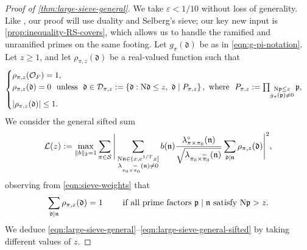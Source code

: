 \documentclass[11pt]{amsart}
\theoremstyle{remark}
\numberwithin{equation}{section}
\renewcommand{\d}{\mathfrak{d}}
\newcommand{\kd}{\mathfrak{d}}
\newcommand{\p}{\mathfrak{p}}
\newcommand{\n}{\mathfrak{n}}
\newcommand{\N}{\textnormal{N}}
\newcommand{\mD}{\mathcal{D}}
\newcommand{\mL}{\mathcal{L}}
\newcommand{\mO}{\mathcal{O}}
\newcommand{\mS}{\mathcal{S}}
\newcommand{\eps}{\varepsilon}
\renewcommand{\tilde}{\widetilde}
\begin{document}
\begin{proof}[Proof of \cref{thm:large-sieve-general}]
We take $\eps < 1/10$ without loss of generality. Like \cite[Theorem 4.2]{TZ_GLn}, our proof will use duality and Selberg's sieve; our key new input is \cref{prop:inequality-RS-covers}, which allows us to handle the ramified and unramified primes on the same footing.  Let $g_{\pi}(\kd)$ be as in \eqref{eqn:g-pi-notation}.  Let $z\geq 1$, and let $\rho_{\pi,z}(\kd)$ be a real-valued function such that
\begin{equation} \label{eqn:sieve-weights}
    \begin{cases} 
    \rho_{\pi,z}(\mO_F) = 1, \\ 
    \rho_{\pi,z}(\d) = 0\
    \text{ unless }\ 
    \kd \in \mD_{\pi,z} := \left\{\d : \N \d \le z,\ \d \mid P_{\pi,z}\right\},\text{ where }\ 
    P_{\pi,z} := \prod_{\substack{\N \p \le z \\ g_\pi(\p) \neq 0}} \p,\\
    |\rho_{\pi,z}(\kd)|\leq 1.
    \end{cases}
\end{equation}
We consider the general sifted sum
\begin{equation}\label{eqn:general-large-sieve-sum}
    \mL(z) := \max_{\|b\|_2 = 1} \sum_{\pi \in \mS}
    \Bigg| \sum_{\substack{\N \n \in (x, e^{1/T}x] \\ \lambda_{\pi_0 \times \tilde\pi_0}(\n) \neq 0}} b(\n) \frac{\lambda^\circ_{\pi \times \pi_0}(\n)}{\sqrt{\lambda_{\pi_0 \times \tilde\pi_0}(\n)}} \sum_{\d \mid \n} \rho_{\pi,z}(\d) \Bigg|^2,
\end{equation}
observing from \eqref{eqn:sieve-weights} that
\begin{equation} \label{eqn:key-sieve-property}
    \sum_{\d \mid \n} \rho_{\pi,z}(\d) = 1
    \qquad 
    \text{ if all prime factors } \p \mid \n \text{ satisfy } \N \p > z.
\end{equation}
We deduce \eqref{eqn:large-sieve-general}--\eqref{eqn:large-sieve-general-sifted} by taking different values of $z$.


\end{proof}
\end{document}
